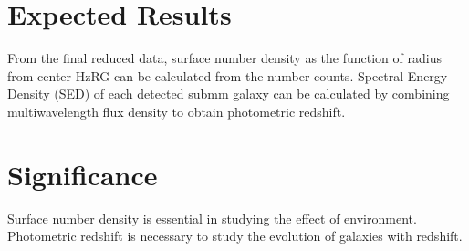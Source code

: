 \documentclass{article}
\begin{document}
\section{Expected Results}
From the final reduced data, surface number density as the function of radius from center HzRG can be calculated from the number counts. Spectral Energy Density (SED) of each detected submm galaxy can be calculated by combining multiwavelength flux density to obtain photometric redshift.

\section{Significance}
Surface number density is essential in studying the effect of environment. Photometric redshift is necessary to study the evolution of galaxies with redshift.



\end{document}
